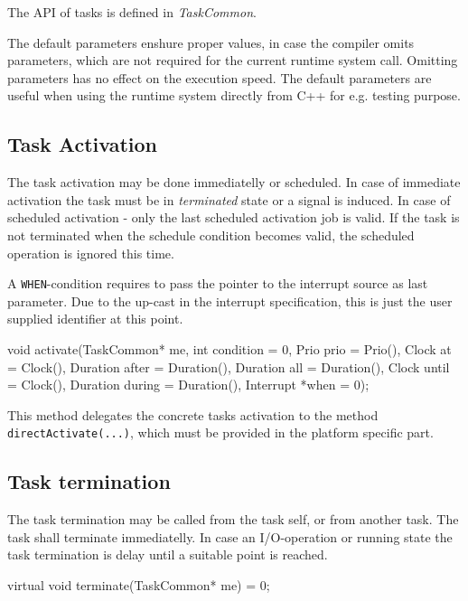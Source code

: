 The API of tasks is defined in {\em TaskCommon}.

The default parameters enshure proper values, in case the compiler omits 
parameters, which are not required for the current runtime system call.
Omitting parameters has no effect on the execution speed.
The default parameters are useful when using the runtime system
directly from C++ for e.g. testing purpose.

\subsection{Task Activation}
The task activation may be done immediatelly or scheduled. 
In case of immediate activation the task must be in {\em terminated} state or
a signal is induced.
In case of scheduled activation - only the last scheduled activation job is
valid. If the task is not terminated when the schedule condition becomes valid,
the scheduled operation is ignored this time.

A \verb|WHEN|-condition requires to pass the pointer to the interrupt source
as last parameter. Due to the up-cast in the interrupt specification, this
is just the user supplied identifier at this point.

\begin{CppCode}
void activate(TaskCommon* me,
              int condition = 0,
              Prio prio = Prio(),
              Clock at = Clock(),
              Duration after = Duration(),
              Duration all = Duration(),
              Clock until = Clock(),
              Duration during = Duration(),
              Interrupt *when = 0);
\end{CppCode}

This method delegates the concrete tasks activation to the method
\verb|directActivate(...)|, which must be provided in the platform specific
part.

\subsection{Task termination}
The task termination may be called from the task self, or from another task.
The task shall terminate immediatelly.
 In case an I/O-operation or running state
the task termination is delay until a suitable point is reached.

\begin{CppCode}
virtual void terminate(TaskCommon* me) = 0;
\end{CppCode}


